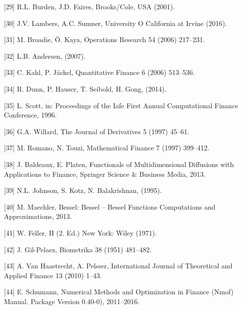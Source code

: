 \documentclass[12pt,twoside]{reedthesis}
\theoremstyle{definition}
\theoremstyle{definition}
\theoremstyle{remark}
\begin{document}
  \hypertarget{ref-burden2001}{}
  {[}29{]} R.L. Burden, J.D. Faires, Brooks/Cole, USA (2001).
  
  \hypertarget{ref-lambers}{}
  {[}30{]} J.V. Lambers, A.C. Sumner, University O California at Irvine
  (2016).
  
  \hypertarget{ref-broadie2006exact}{}
  {[}31{]} M. Broadie, Ö. Kaya, Operations Research 54 (2006) 217--231.
  
  \hypertarget{ref-andersen}{}
  {[}32{]} L.B. Andersen, (2007).
  
  \hypertarget{ref-kahl2006fast}{}
  {[}33{]} C. Kahl, P. Jäckel, Quantitative Finance 6 (2006) 513--536.
  
  \hypertarget{ref-dunn2014estimating}{}
  {[}34{]} R. Dunn, P. Hauser, T. Seibold, H. Gong, (2014).
  
  \hypertarget{ref-scott1996}{}
  {[}35{]} L. Scott, in: Proceedings of the Iafe First Annual
  Computational Finance Conference, 1996.
  
  \hypertarget{ref-willard1997}{}
  {[}36{]} G.A. Willard, The Journal of Derivatives 5 (1997) 45--61.
  
  \hypertarget{ref-romano1997}{}
  {[}37{]} M. Romano, N. Touzi, Mathematical Finance 7 (1997) 399--412.
  
  \hypertarget{ref-baldeaux}{}
  {[}38{]} J. Baldeaux, E. Platen, Functionals of Multidimensional
  Diffusions with Applications to Finance, Springer Science \& Business
  Media, 2013.
  
  \hypertarget{ref-johnson1995}{}
  {[}39{]} N.L. Johnson, S. Kotz, N. Balakrishnan, (1995).
  
  \hypertarget{ref-besselpkg}{}
  {[}40{]} M. Maechler, Bessel: Bessel -- Bessel Functions Computations
  and Approximations, 2013.
  
  \hypertarget{ref-feller1971introduction}{}
  {[}41{]} W. Feller, II (2. Ed.) New York: Wiley (1971).
  
  \hypertarget{ref-gil1951note}{}
  {[}42{]} J. Gil-Pelaez, Biometrika 38 (1951) 481--482.
  
  \hypertarget{ref-van2010efficient}{}
  {[}43{]} A. Van Haastrecht, A. Pelsser, International Journal of
  Theoretical and Applied Finance 13 (2010) 1--43.
  
  \hypertarget{ref-nmofpack}{}
  {[}44{]} E. Schumann, Numerical Methods and Optimization in Finance
  (Nmof) Manual. Package Version 0.40-0), 2011--2016.


\end{document}
